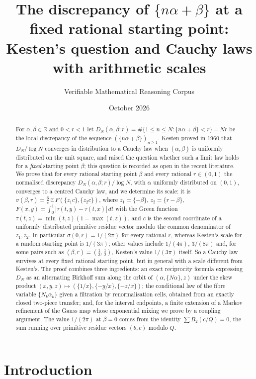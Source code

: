 \documentclass[11pt]{amsart}
\title[Kesten's limit law at a fixed rational starting point]{The discrepancy of $\{n\alpha+\beta\}$ at a fixed rational starting point:\\ Kesten's question and Cauchy laws with arithmetic scales}
\author{Verifiable Mathematical Reasoning Corpus}
\date{October 2026}
\theoremstyle{definition}
\numberwithin{equation}{section}
\newcommand{\R}{\mathbb{R}}
\newcommand{\E}{\mathbb{E}}
\newcommand{\fr}[1]{\{#1\}}
\begin{document}
\begin{abstract}
For $\alpha,\beta\in\R$ and $0<r<1$ let $D_N(\alpha,\beta;r)=\#\{1\le n\le N:\fr{n\alpha+\beta}<r\}-Nr$ be the local discrepancy of the
sequence $(\fr{n\alpha+\beta})_{n\ge1}$. Kesten proved in 1960 that $D_N/\log N$ converges in distribution to a Cauchy law when $(\alpha,\beta)$
is uniformly distributed on the unit square, and raised the question whether such a limit law holds for a \emph{fixed} starting point
$\beta$; this question is recorded as open in the recent literature. We prove that for every rational starting point $\beta$ and every rational
$r\in(0,1)$ the normalised discrepancy $D_N(\alpha,\beta;r)/\log N$, with $\alpha$ uniformly distributed on $(0,1)$, converges to a centred
Cauchy law, and we determine its scale: it is $\sigma(\beta,r)=\frac6\pi\,\E\,F(\fr{z_1c},\fr{z_2c})$, where $z_1=\fr{-\beta}$, $z_2=\fr{r-\beta}$,
$F(x,y)=\int_0^1|\tau(t,y)-\tau(t,x)|\,dt$ with the Green function $\tau(t,z)=\min(t,z)(1-\max(t,z))$, and $c$ is the second coordinate of a
uniformly distributed primitive residue vector modulo the common denominator of $z_1,z_2$. In particular $\sigma(0,r)=1/(2\pi)$ for every
rational $r$, whereas Kesten's scale for a random starting point is $1/(3\pi)$; other values include $1/(4\pi)$, $3/(8\pi)$ and, for some
pairs such as $(\beta,r)=(\frac13,\frac12)$, Kesten's value $1/(3\pi)$ itself. So a Cauchy law survives at every fixed rational starting point,
but in general with a scale different from Kesten's.
The proof combines three ingredients: an exact reciprocity formula expressing $D_N$ as an alternating Birkhoff sum along the orbit of
$(\alpha,\fr{N\alpha},z)$ under the skew product $(x,y,z)\mapsto(\fr{1/x},\fr{-y/x},\fr{-z/x})$; the conditional law of the fibre variable
$\fr{N_k\alpha_k}$ given a filtration by renormalisation cells, obtained from an exactly closed two-piece transfer; and, for the interval
endpoints, a finite extension of a Markov refinement of the Gauss map whose exponential mixing we prove by a coupling argument. The value
$1/(2\pi)$ at $\beta=0$ comes from the identity $\sum B_2(c/Q)=0$, the sum running over primitive residue vectors $(b,c)$ modulo $Q$.
\end{abstract}

\maketitle
\section{Introduction}
\end{document}
